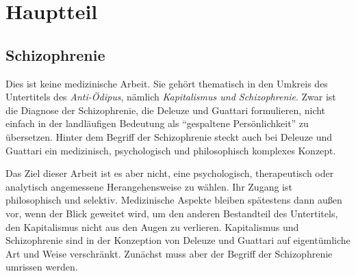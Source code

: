 \documentclass[12pt,
               DIV13,
               paper=a4,
               twoside=false,
               onehalfspacing,
               bibliography=totoc,
               toc=graduated,
               draft,
               ]{scrartcl}
\newcommand{\worries}[1]{\ifdraft{\textcolor{blue}{\texttt{(#1)}}}{}}
\newcommand{\dg}{Deleuze und Guattari\xspace}
\begin{document}

\section{Hauptteil}


\subsection{Schizophrenie}


Dies ist keine medizinische Arbeit. Sie gehört thematisch in den
Umkreis des Untertitels des \emph{Anti-Ödipus}, nämlich
\emph{Kapitalismus und Schizophrenie}. Zwar ist die Diagnose der
Schizophrenie, die Deleuze und Guattari formulieren, nicht einfach in
der landläufigen Bedeutung als "`gespaltene Persönlichkeit"' zu
übersetzen. Hinter dem Begriff der Schizophrenie steckt auch bei
Deleuze und Guattari ein medizinisch, psychologisch und philosophisch
komplexes Konzept.

Das Ziel dieser Arbeit ist es aber nicht, eine psychologisch,
therapeutisch oder analytisch angemessene Herangehensweise zu wählen.
Ihr Zugang ist philosophisch und selektiv. Medizinische Aspekte
bleiben spätestens dann außen vor, wenn der Blick geweitet wird, um
den anderen Bestandteil des Untertitels, den Kapitalismus nicht aus
den Augen zu verlieren. Kapitalismus und Schizophrenie sind in der
Konzeption von \dg auf eigentümliche Art und Weise verschränkt.
Zunächst muss aber der Begriff der Schizophrenie umrissen werden.
\end{document}
